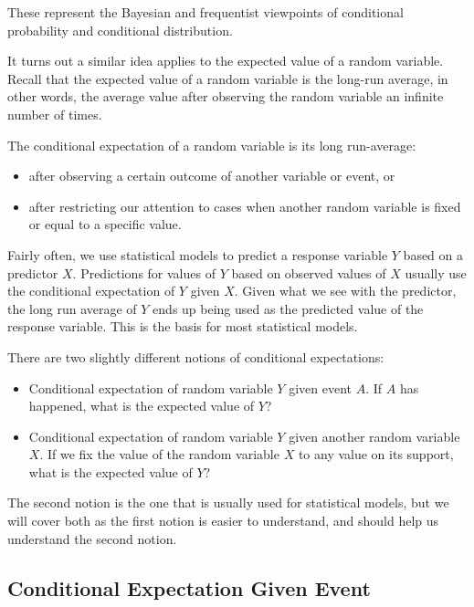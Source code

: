 \documentclass[
]{book}
\providecommand{\tightlist}{%
  \setlength{\itemsep}{0pt}\setlength{\parskip}{0pt}}
\begin{document}
These represent the Bayesian and frequentist viewpoints of conditional probability and conditional distribution.

It turns out a similar idea applies to the expected value of a random variable. Recall that the expected value of a random variable is the long-run average, in other words, the average value after observing the random variable an infinite number of times.

The conditional expectation of a random variable is its long run-average:

\begin{itemize}
\tightlist
\item
  after observing a certain outcome of another variable or event, or
\item
  after restricting our attention to cases when another random variable is fixed or equal to a specific value.
\end{itemize}

Fairly often, we use statistical models to predict a response variable \(Y\) based on a predictor \(X\). Predictions for values of \(Y\) based on observed values of \(X\) usually use the conditional expectation of \(Y\) given \(X\). Given what we see with the predictor, the long run average of \(Y\) ends up being used as the predicted value of the response variable. This is the basis for most statistical models.

There are two slightly different notions of conditional expectations:

\begin{itemize}
\tightlist
\item
  Conditional expectation of random variable \(Y\) given event \(A\). If \(A\) has happened, what is the expected value of \(Y\)?
\item
  Conditional expectation of random variable \(Y\) given another random variable \(X\). If we fix the value of the random variable \(X\) to any value on its support, what is the expected value of \(Y\)?
\end{itemize}

The second notion is the one that is usually used for statistical models, but we will cover both as the first notion is easier to understand, and should help us understand the second notion.

\hypertarget{conditional-expectation-given-event}{%
\subsection{Conditional Expectation Given Event}\label{conditional-expectation-given-event}}
\end{document}
